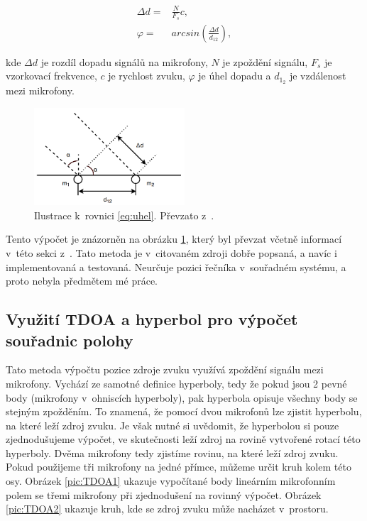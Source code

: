 \begin{align}
    \label{eq:uhel}
    \Delta d =& \frac{N}{F_s}c, \\
    \varphi =& arcsin(\frac{\Delta d}{d_{12}}),
\end{align}

kde $\Delta d$ je rozdíl dopadu signálů na mikrofony, $N$ je zpoždění signálu, $F_s$ je vzorkovací frekvence, $c$ je rychlost zvuku, $\varphi$ je úhel dopadu a $d_1_2$ je vzdálenost mezi mikrofony.

\begin{figure}[!htpb]
	\centering
	\includegraphics[width=0.5\textwidth]{obrazky-figures/TDOAuhel.png}
	\caption{Ilustrace k~rovnici \ref{eq:uhel}. Převzato z~\cite{chu}.}
	\label{pic:uhel}
\end{figure}

Tento výpočet je znázorněn na obrázku \ref{pic:uhel}, který byl převzat včetně informací v~této sekci z~\cite{chu}. Tato metoda je v~citovaném zdroji dobře popsaná, a navíc i implementovaná a testovaná. Neurčuje pozici řečníka v~souřadném systému, a proto nebyla předmětem mé práce.

\subsection{Využití TDOA a hyperbol pro výpočet souřadnic polohy}
\label{Hyperbolická metoda}

Tato metoda výpočtu pozice zdroje zvuku využívá zpoždění signálu mezi mikrofony. Vychází ze samotné definice hyperboly, tedy že pokud jsou 2 pevné body (mikrofony v~ohniscích hyperboly), pak hyperbola opisuje všechny body se stejným zpožděním. To znamená, že pomocí dvou mikrofonů lze zjistit hyperbolu, na které leží zdroj zvuku. Je však nutné si uvědomit, že hyperbolou si pouze zjednodušujeme výpočet, ve skutečnosti leží zdroj na rovině vytvořené rotací této hyperboly. Dvěma mikrofony tedy zjistíme rovinu, na které leží zdroj zvuku. Pokud použijeme tři mikrofony na jedné přímce, můžeme určit kruh kolem této osy. Obrázek \ref{pic:TDOA1} ukazuje vypočítané body lineárním mikrofonním polem se třemi mikrofony při zjednodušení na rovinný výpočet. Obrázek \ref{pic:TDOA2} ukazuje kruh, kde se zdroj zvuku může nacházet v~prostoru.

